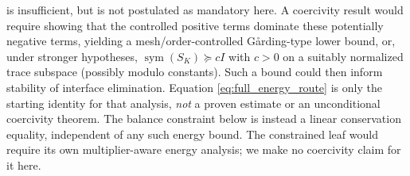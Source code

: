 \documentclass[11pt]{article}
\begin{document}
is insufficient, but is not postulated as mandatory here.
A coercivity result would require showing that the controlled positive
terms dominate these potentially negative terms, yielding a
mesh/order-controlled G\aa rding-type lower bound, or, under stronger
hypotheses, $\operatorname{sym}(S_K)\succeq cI$ with $c>0$
on a suitably normalized trace subspace (possibly modulo constants).
Such a bound could then inform stability of interface elimination.
Equation \eqref{eq:full_energy_route} is only the starting identity for
that analysis, \emph{not} a proven estimate or an unconditional
coercivity theorem.  The balance constraint below is instead a linear
conservation equality, independent of any such energy bound.  The
constrained leaf would require its own multiplier-aware energy analysis;
we make no coercivity claim for it here.
\end{document}
